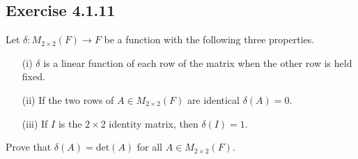 \subsection*{Exercise 4.1.11} Let \( \delta: {M}_{2 \times 2}(F) \to F  \) be a function with the following three properties.
\begin{enumerate}
    \item[(i)] \( \delta \) is a linear function of each row of the matrix when the other row is held fixed.
    \item[(ii)] If the two rows of \( A \in {M}_{2 \times 2}(F)  \) are identical \( \delta(A) = 0  \).
    \item[(iii)] If \( I  \) is the \( 2 \times 2  \) identity matrix, then \( \delta(I) = 1  \).
\end{enumerate}
Prove that \( \delta(A) = \text{det}(A)  \) for all \( A \in {M}_{2 \times 2}(F)  \). 
